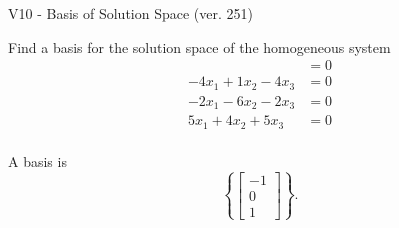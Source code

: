 \begin{exercise}
  \begin{exerciseTitle}V10 - Basis of Solution Space (ver. 251)\end{exerciseTitle}
  \begin{exerciseStatement}
    Find a basis for the solution space of the homogeneous system 
\begin{align*}
 &= 0  \\ 
 -4 x_ 1 + 1 x_ 2 -4 x_ 3 &= 0  \\ 
  -2 x_ 1 -6 x_ 2 -2 x_ 3 &= 0  \\ 
  5 x_ 1 + 4 x_ 2 + 5 x_ 3 &= 0  \\ 
 \end{align*}


 
  \end{exerciseStatement}

  \begin{exerciseAnswer}
   A basis is   
\[\left\{\left[\begin{array}{c}
-1 \\
0 \\
1
\end{array}\right]\right\}.\]

  


  \end{exerciseAnswer}
\end{exercise}